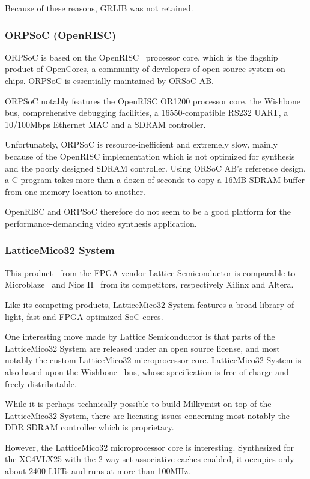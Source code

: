 \documentclass[a4paper,11pt]{kthesis}
\begin{document}
Because of these reasons, GRLIB was not retained.

\subsubsection{ORPSoC (OpenRISC)}
ORPSoC is based on the OpenRISC~\cite{openrisc} processor core, which is the flagship product of OpenCores, a community of developers of open source system-on-chips. ORPSoC is essentially maintained by ORSoC AB.

ORPSoC notably features the OpenRISC OR1200 processor core, the Wishbone~\cite{wishbone} bus, comprehensive debugging facilities, a 16550-compatible RS232 UART, a 10/100Mbps Ethernet MAC and a SDRAM controller.

Unfortunately, ORPSoC is resource-inefficient and extremely slow, mainly because of the OpenRISC implementation which is not optimized for synthesis and the poorly designed SDRAM controller. Using ORSoC AB's reference design, a C program takes more than a dozen of seconds to copy a 16MB SDRAM buffer from one memory location to another.

OpenRISC and ORPSoC therefore do not seem to be a good platform for the performance-demanding video synthesis application.

\subsubsection{LatticeMico32 System}
This product~\cite{mico32} from the FPGA vendor Lattice Semiconductor is comparable to Microblaze~\cite{microblaze} and Nios II~\cite{nios} from its competitors, respectively Xilinx and Altera.

Like its competing products, LatticeMico32 System features a broad library of light, fast and FPGA-optimized SoC cores.

One interesting move made by Lattice Semiconductor is that parts of the LatticeMico32 System are released under an open source license, and most notably the custom LatticeMico32 microprocessor core. LatticeMico32 System is also based upon the Wishbone~\cite{wishbone} bus, whose specification is free of charge and freely distributable.

While it is perhaps technically possible to build Milkymist on top of the LatticeMico32 System, there are licensing issues concerning most notably the DDR SDRAM controller which is proprietary.

However, the LatticeMico32 microprocessor core is interesting. Synthesized for the XC4VLX25 with the 2-way set-associative caches enabled, it occupies only about 2400 LUTs and runs at more than 100MHz.
\end{document}
